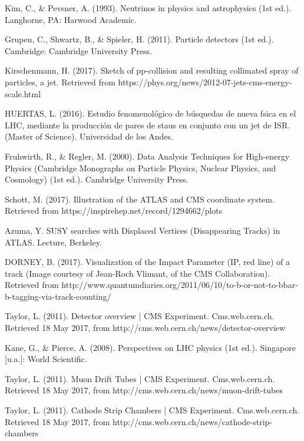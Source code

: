 \documentclass[11pt]{book}
\begin{document}
\begin{thebibliography}{10}
 Kim, C., \& Pevsner, A. (1993). Neutrinos in physics and astrophysics (1st ed.). Langhorne, PA: Harwood Academic.

 Grupen, C., Shwartz, B., \& Spieler, H. (2011). Particle detectors (1st ed.). Cambridge: Cambridge University Press.

 Kirschenmann, H. (2017). Sketch of pp-collision and resulting collimated spray of particles, a jet. Retrieved from https://phys.org/news/2012-07-jets-cms-energy-scale.html

 HUERTAS, L. (2016). Estudio fenomenológico de búsquedas de nueva fsica en el LHC, mediante la producción de pares de staus en conjunto con un jet de ISR. (Master of Science). Universidad de los Andes.

 Fruhwirth, R., \& Regler, M. (2000). Data Analysis Techniques for High-energy Physics (Cambridge Monographs on Particle Physics, Nuclear Physics, and Cosmology) (1st ed.). Cambridge University Press.

 Schott, M. (2017). Illustration of the ATLAS and CMS coordinate system. Retrieved from https://inspirehep.net/record/1294662/plots

  Azuma, Y. SUSY searches with Displaced Vertices (Disappearing Tracks) in ATLAS. Lecture, Berkeley.

 DORNEY, B. (2017). Visualization of the Impact Parameter (IP, red line) of a track (Image courtesy of Jean-Roch Vlimant, of the CMS Collaboration). Retrieved from http://www.quantumdiaries.org/2011/06/10/to-b-or-not-to-bbar-b-tagging-via-track-counting/

 Taylor, L. (2011). Detector overview | CMS Experiment. Cms.web.cern.ch. Retrieved 18 May 2017, from http://cms.web.cern.ch/news/detector-overview

 Kane, G., \& Pierce, A. (2008). Perspectives on LHC physics (1st ed.). Singapore [u.a.]: World Scientific.

 Taylor, L. (2011). Muon Drift Tubes | CMS Experiment. Cms.web.cern.ch. Retrieved 18 May 2017, from http://cms.web.cern.ch/news/muon-drift-tubes

 Taylor, L. (2011). Cathode Strip Chambers | CMS Experiment. Cms.web.cern.ch. Retrieved 18 May 2017, from http://cms.web.cern.ch/news/cathode-strip-chambers


\end{thebibliography}
\end{document}
